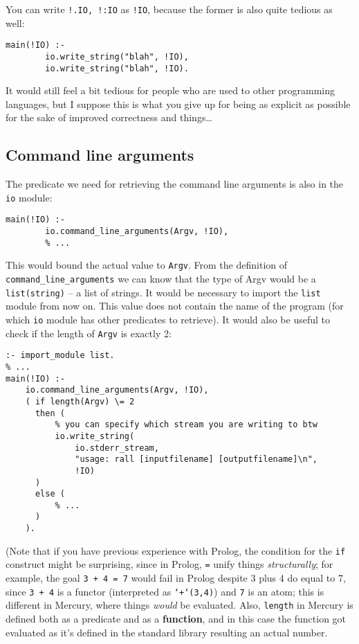 You can write \texttt{!.IO, !:IO} as \texttt{!IO}, because the former is also quite tedious as well:

\begin{lstlisting}[language=Mercury]
	main(!IO) :-
	    io.write_string("blah", !IO),
	    io.write_string("blah", !IO).
\end{lstlisting}

It would still feel a bit tedious for people who are used to other programming languages, but I suppose this is what you give up for being as explicit as possible for the sake of improved correctness and things\ldots{}

\subsection{Command line arguments}
\label{sec:orge1b3b54}

The predicate we need for retrieving the command line arguments is also in the \texttt{io} module:

\begin{lstlisting}[language=Mercury]
	main(!IO) :-
        io.command_line_arguments(Argv, !IO),
	    % ...
\end{lstlisting}

This would bound the actual value to \texttt{Argv}. From the definition of \texttt{command\_line\_arguments} we can know that the type of Argv would be a \texttt{list(string)} -- a list of strings. It would be necessary to import the \texttt{list} module from now on. This value does not contain the name of the program (for which \texttt{io} module has other predicates to retrieve). It would also be useful to check if the length of \texttt{Argv} is exactly 2:

\begin{lstlisting}[language=Mercury]
:- import_module list.
% ...
main(!IO) :-
    io.command_line_arguments(Argv, !IO),
    ( if length(Argv) \= 2
      then (
          % you can specify which stream you are writing to btw
          io.write_string(
              io.stderr_stream,
              "usage: rall [inputfilename] [outputfilename]\n",
              !IO)
      )
      else (
          % ...
      )
    ).
\end{lstlisting}

(Note that if you have previous experience with Prolog, the condition for the \texttt{if} construct might be surprising, since in Prolog, \texttt{=} unify things \textit{structurally}; for example, the goal \texttt{3 + 4 = 7} would fail in Prolog despite 3 plus 4 do equal to 7, since \texttt{3 + 4} is a functor (interpreted as \texttt{`+`(3,4)}) and \texttt{7} is an atom; this is different in Mercury, where things \textit{would} be evaluated. Also, \texttt{length} in Mercury is defined both as a predicate and as a \textbf{function}, and in this case the function got evaluated as it's defined in the standard library resulting an actual number. 

